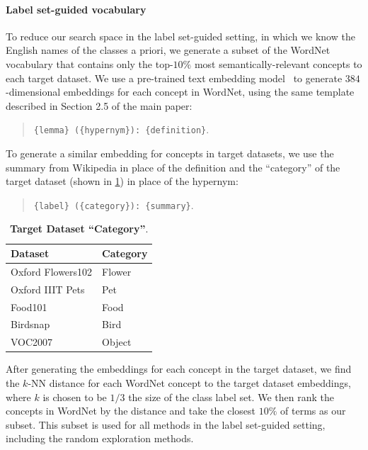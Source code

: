 \paragraph{Label set-guided vocabulary}
To reduce our search space in the label set-guided setting, in which we know the English names of the classes a priori, we generate a subset of the WordNet vocabulary that contains only the top-$10\%$ most semantically-relevant concepts to each target dataset.
We use a pre-trained text embedding model~\cite{reimers2019sentence} to generate $384$-dimensional embeddings for each concept in WordNet, using the same template described in Section 2.5 of the main paper: %

\begin{quote}
\vspace{-0.07in}
{\tt {\small \{lemma\} (\{hypernym\}): \{definition\}}}.
\vspace{-0.07in}
\end{quote}

To generate a similar embedding for concepts in target datasets, we use the summary from Wikipedia in place of the definition and the ``category'' of the target dataset (shown in \cref{tab:dataset_categories}) in place of the hypernym:

\begin{quote}
\vspace{-0.07in}
{\tt {\small \{label\} (\{category\}): \{summary\}}}.
\vspace{-0.07in}
\end{quote}


\begin{table}
    \centering
    \begin{tabular}{ll}
    \toprule
        Dataset & Category \\
    \midrule
        Oxford Flowers102 & Flower \\
        Oxford IIIT Pets & Pet \\
        Food101 & Food \\
        Birdsnap & Bird \\
        VOC2007 & Object \\
    \bottomrule
    \end{tabular}
    \caption{\textbf{Target Dataset ``Category''}.
    }
    \label{tab:dataset_categories}
\end{table}

After generating the embeddings for each concept in the target dataset, we find the $k$-NN distance for each WordNet concept to the target dataset embeddings, where $k$ is chosen to be $1/3$ the size of the class label set.
We then rank the concepts in WordNet by the distance and take the closest $10\%$ of terms as our subset. This subset is used for all methods in the label set-guided setting, including the random exploration methods. 






